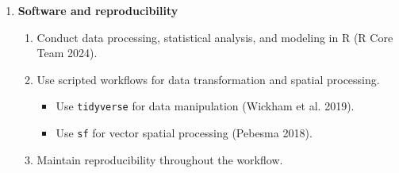 \documentclass[
  letterpaper,
  DIV=11,
  numbers=noendperiod]{scrartcl}
\providecommand{\tightlist}{%
  \setlength{\itemsep}{0pt}\setlength{\parskip}{0pt}}
\begin{document}
\begin{enumerate}
\begin{enumerate}
    \begin{itemize}
    \tightlist
    \item
      Identify locations where both models predict high suitability
      (Johnson and Gillingham 2005).
    \item
      Identify locations where both models predict low suitability
      (Johnson and Gillingham 2005).
    \item
      Identify locations where MaxEnt predicts high suitability while
      the HSI predicts low suitability (Johnson and Gillingham 2005).
    \item
      Identify locations where the HSI predicts high suitability while
      MaxEnt predicts low suitability (Johnson and Gillingham 2005).
    \item
      Consider an agreement statistic such as Kappa if categorical
      suitability classes are used (Johnson and Gillingham 2005).
    \end{itemize}
  \item
    Interpret disagreement between models.

    \begin{itemize}
    \tightlist
    \item
      Determine whether disagreement is geographically concentrated
      (Johnson and Gillingham 2005).
    \item
      Evaluate whether disagreement corresponds with particular
      environmental predictors.
    \item
      Consider differences in data availability and modeling assumptions
      between MaxEnt and the HSI (Johnson and Gillingham 2005;
      Geselbracht et al. 2024).
    \item
      Avoid treating either modeling approach as automatically
      representing ground truth (Johnson and Gillingham 2005).
    \end{itemize}
  \end{enumerate}
\item
  \textbf{Software and reproducibility}

  \begin{enumerate}
  \def\labelenumii{\arabic{enumii}.}
  \item
    Conduct data processing, statistical analysis, and modeling in R (R
    Core Team 2024).
  \item
    Use scripted workflows for data transformation and spatial
    processing.

    \begin{itemize}
    \tightlist
    \item
      Use \texttt{tidyverse} for data manipulation (Wickham et al.
      2019).
    \item
      Use \texttt{sf} for vector spatial processing (Pebesma 2018).
    \end{itemize}
  \item
    Maintain reproducibility throughout the workflow.


\end{enumerate}
\end{enumerate}
\end{document}
